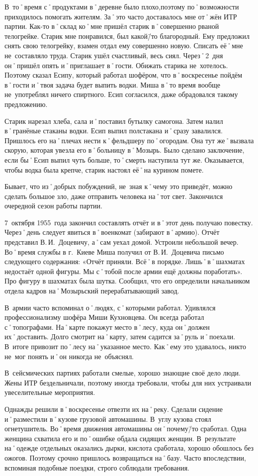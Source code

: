 В~то˚время с˚продуктами в˚деревне было плохо,поэтому по˚возможности приходилось помогать жителям. За˚это часто доставалось мне от˚жён ИТР партии. Как-то в˚склад ко˚мне пришёл старик в˚совершенно рваной телогрейке. Старик мне понравился, был какой\=/то благородный. Ему предложил снять свою телогрейку, взамен отдал ему совершенно новую. Списать её˚мне не~составляло труда. Старик ушёл счастливый, весь сиял. Через˚2~дня он˚пришёл опять и˚приглашает в˚гости. Обижать старика не~хотелось. Поэтому сказал Есипу, который работал шофёром, что в˚воскресенье пойдём в˚гости и˚твоя задача будет выпить водки. Миша в˚то время вообще не~употреблял ничего спиртного. Есип согласился, даже обрадовался такому предложению. 

Старик нарезал хлеба, сала и˚поставил бутылку самогона. Затем налил в˚гранёные стаканы водки. Есип выпил полстакана и˚сразу завалился. Пришлось его на˚плечах нести к˚фельдшеру по˚огородам. Она тут же˚вызвала скорую, которая увезла его в˚больницу в˚Мозырь. Было сделано заключение, если бы˚Есип выпил чуть больше, то˚смерть наступила тут же. Оказывается, чтобы водка была крепче, старик настоял её˚на курином помете.

Бывает, что из˚добрых побуждений, не~зная к˚чему это приведёт, можно сделать большое зло, даже отправить человека на˚тот свет. Закончился очередной сезон работы партии.

7~октября 1955~года закончил составлять отчёт и в˚этот день получаю повестку. Через˚день следует явиться в˚военкомат (забирают в˚армию). Отчёт представил В.\,И.~Доцевичу, а˚сам уехал домой. Устроили небольшой вечер. Во˚время службы в г.~Киеве Миша получил от В.\,И.~Доцевича письмо следующего содержания: «Отчёт приняли. Всё˚в порядке. Лишь˚в˚шахматах недостаёт одной фигуры. Мы с˚тобой после армии ещё должны поработать». Про фигуру в шахматах была шутка. Сообщил, что его определили начальником отдела кадров на˚Мозырьский перерабатывающий завод.

В~армии часто вспоминал о˚людях, с˚которыми работал. Удивлялся профессионализму шофёра Миши Кухновцева. Он всегда работал с˚топографами. На˚карте покажут место в˚лесу, куда он˚должен их˚доставить. Долго смотрит на˚карту, затем садится за˚руль и˚поехали. В~итоге привозит по˚лесу на˚указанное место. Как˚ему это удавалось, никто не~мог понять и˚он никогда не~объяснял.

В~сейсмических партиях работали смелые, хорошо знающие своё дело люди. Жены ИТР бездельничали, поэтому иногда требовали, чтобы для них устраивали увеселительные мероприятия.

Однажды решили в˚воскресенье отвезти их на˚реку. Сделали сидение и˚разместили в˚кузове грузовой автомашины. В~углу кузова стоял огнетушитель. Во˚время движения автомашины он˚почему\=/то сработал. Одна женщина схватила его и по˚ошибке обдала сидящих женщин. В~результате на˚одежде отдельных оказались дырки, кислота сработала, хорошо обошлось без ожогов. Поэтому срочно пришлось возвращаться на˚базу. Часто впоследствии, вспоминая подобные поездки, строго соблюдали требования.